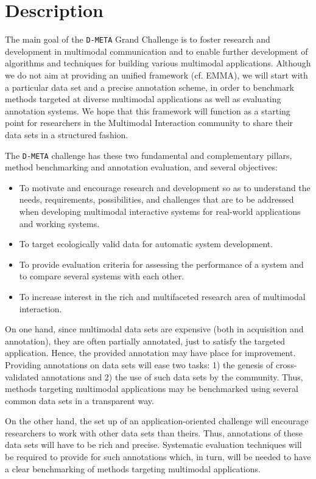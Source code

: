 \documentclass{sig-alternate}
\begin{document}
\section{Description}
The main goal of the \texttt{D-META} Grand Challenge is to foster research and development in multimodal communication
and to enable further development of algorithms and techniques for building various multimodal applications. Although
we do not aim at providing an unified framework (cf. EMMA), we will start with a particular data set and a precise
annotation scheme, in order to benchmark methods targeted at diverse multimodal applications as well as evaluating
annotation systems. We hope that this framework will function as a starting point for researchers in the Multimodal
Interaction community to share their data sets in a structured fashion.\vspace{0.4cm}

The \texttt{D-META} challenge has these two fundamental and complementary pillars, method benchmarking and
annotation evaluation, and several objectives:
\begin{itemize}
\item To motivate and encourage research and development so as to understand the needs, requirements, possibilities, and
challenges that are to be addressed when developing multimodal interactive systems for real-world applications and
working systems.
\item To target ecologically valid data for automatic system development.
\item To provide evaluation criteria for assessing the performance of a system and to compare several systems with each
other.
\item To increase interest in the rich and multifaceted research area of multimodal interaction.
\end{itemize}

On one hand, since multimodal data sets are expensive (both in acquisition and annotation), they are often partially
annotated, just to satisfy the targeted application. Hence, the provided annotation may have place for
improvement. Providing annotations on data sets will ease two tasks: 1) the genesis of
cross-validated annotations and 2) the use of such data sets by the community. Thus, methods targeting multimodal
applications may be benchmarked using several common data sets in a transparent way.\vspace{0.4cm}

On the other hand, the set up of an application-oriented challenge will encourage researchers to work with other data
sets than theirs. Thus, annotations of these data sets will have to be rich and precise. Systematic evaluation
techniques will be required to provide for such annotations which, in turn, will be needed to have a clear
benchmarking of methods targeting multimodal applications.\vspace{0.4cm}
\end{document}
